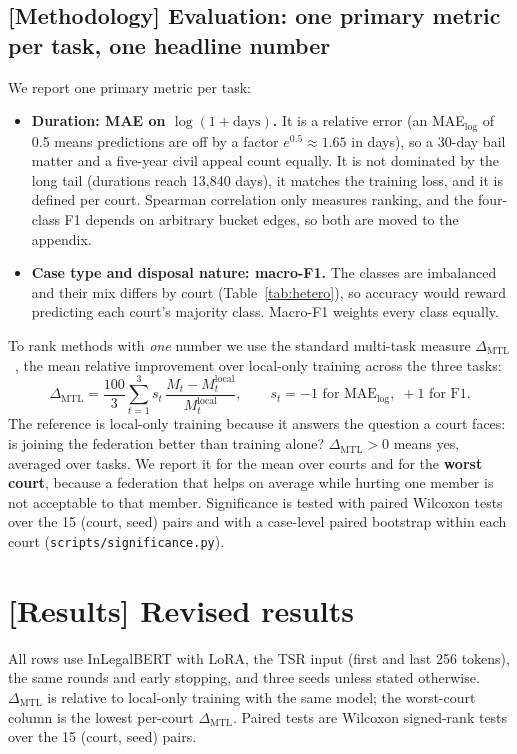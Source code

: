 \subsection*{[Methodology] Evaluation: one primary metric per task, one headline number}
We report one primary metric per task:
\begin{itemize}
  \item \textbf{Duration: MAE on $\log(1+\text{days})$.} It is a relative error (an MAE$_{\log}$ of 0.5
        means predictions are off by a factor $e^{0.5}\approx1.65$ in days), so a 30-day bail matter and a
        five-year civil appeal count equally. It is not dominated by the long tail (durations reach
        13,840 days), it matches the training loss, and it is defined per court. Spearman correlation
        only measures ranking, and the four-class F1 depends on arbitrary bucket edges, so both are
        moved to the appendix.
  \item \textbf{Case type and disposal nature: macro-F1.} The classes are imbalanced and their mix
        differs by court (Table~\ref{tab:hetero}), so accuracy would reward predicting each court's
        majority class. Macro-F1 weights every class equally.
\end{itemize}
To rank methods with \emph{one} number we use the standard multi-task measure
$\Delta_{\text{MTL}}$~\cite{maninis2019attentive,vandenhende2021mtl}, the mean relative improvement
over local-only training across the three tasks:
\begin{equation}
\Delta_{\text{MTL}} = \frac{100}{3}\sum_{t=1}^{3} s_t\,\frac{M_t - M_t^{\text{local}}}{M_t^{\text{local}}},\qquad
s_t=-1 \text{ for MAE}_{\log},\; +1 \text{ for F1}.
\end{equation}
The reference is local-only training because it answers the question a court faces: is joining the
federation better than training alone? $\Delta_{\text{MTL}}>0$ means yes, averaged over tasks. We
report it for the mean over courts and for the \textbf{worst court}, because a federation that helps on
average while hurting one member is not acceptable to that member. Significance is tested with paired
Wilcoxon tests over the 15 (court, seed) pairs and with a case-level paired bootstrap within each court
(\texttt{scripts/significance.py}).

\section*{[Results] Revised results}
All rows use InLegalBERT with LoRA, the TSR input (first and last 256 tokens), the same rounds and early
stopping, and three seeds unless stated otherwise. $\Delta_{\text{MTL}}$ is relative to local-only
training with the same model; the worst-court column is the lowest per-court $\Delta_{\text{MTL}}$.
Paired tests are Wilcoxon signed-rank tests over the 15 (court, seed) pairs.


